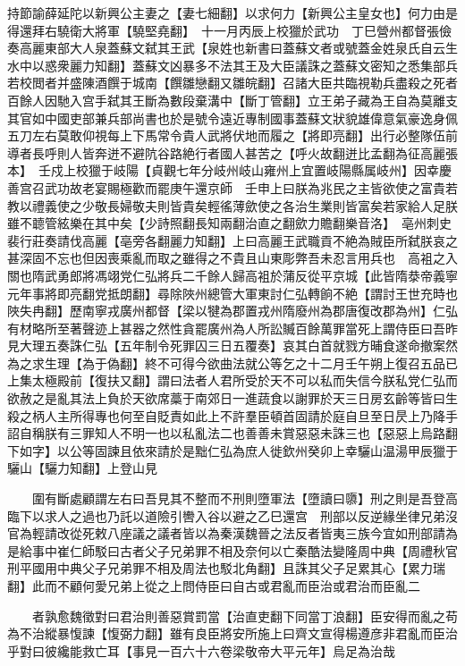 持節諭薛延陀以新興公主妻之【妻七細翻】以求何力【新興公主皇女也】何力由是得還拜右驍衛大將軍【驍堅堯翻】　十一月丙辰上校獵於武功　丁巳營州都督張儉奏高麗東部大人泉蓋蘇文弑其王武【泉姓也新書曰蓋蘇文者或號蓋金姓泉氏自云生水中以惑衆麗力知翻】蓋蘇文凶暴多不法其王及大臣議誅之蓋蘇文密知之悉集部兵若校閲者并盛陳酒饌于城南【饌雛戀翻又雛皖翻】召諸大臣共臨視勒兵盡殺之死者百餘人因馳入宫手弑其王斷為數段棄溝中【斷丁管翻】立王弟子藏為王自為莫離支其官如中國吏部兼兵部尚書也於是號令遠近專制國事蓋蘇文狀貌雄偉意氣豪逸身佩五刀左右莫敢仰視每上下馬常令貴人武將伏地而履之【將即亮翻】出行必整隊伍前導者長呼則人皆奔迸不避阬谷路絶行者國人甚苦之【呼火故翻迸比孟翻為征高麗張本】　壬戍上校獵于岐陽【貞觀七年分岐州岐山雍州上宜置岐陽縣属岐州】因幸慶善宫召武功故老宴賜極歡而罷庚午還京師　壬申上曰朕為兆民之主皆欲使之富貴若教以禮義使之少敬長婦敬夫則皆貴矣輕徭薄歛使之各治生業則皆富矣若家給人足朕雖不聼管絃樂在其中矣【少詩照翻長知兩翻治直之翻歛力贍翻樂音洛】　亳州刺史裴行莊奏請伐高麗【亳旁各翻麗力知翻】上曰高麗王武職貢不絶為賊臣所弑朕哀之甚深固不忘也但因喪乘亂而取之雖得之不貴且山東彫弊吾未忍言用兵也　高袓之入關也隋武勇郎將馮翊党仁弘將兵二千餘人歸高袓於蒲反從平京城【此皆隋㳟帝義寧元年事將即亮翻党抵朗翻】尋除陜州總管大軍東討仁弘轉餉不絶【謂討王世充時也陜失冉翻】歷南寧戎廣州都督【梁以犍為郡置戎州隋廢州為郡唐復改郡為州】仁弘有材略所至著聲迹上甚器之然性貪罷廣州為人所訟贓百餘萬罪當死上謂侍臣曰吾昨見大理五奏誅仁弘【五年制令死罪囚三日五覆奏】哀其白首就戮方晡食遂命撤案然為之求生理【為于偽翻】終不可得今欲曲法就公等乞之十二月壬午朔上復召五品已上集太極殿前【復扶又翻】謂曰法者人君所受於天不可以私而失信今朕私党仁弘而欲赦之是亂其法上負於天欲席藁于南郊日一進蔬食以謝罪於天三日房玄齡等皆曰生殺之柄人主所得專也何至自貶責如此上不許羣臣頓首固請於庭自旦至日昃上乃降手詔自稱朕有三罪知人不明一也以私亂法二也善善未賞惡惡未誅三也【惡惡上烏路翻下如字】以公等固諫且依來請於是黜仁弘為庶人徙欽州癸卯上幸驪山温湯甲辰獵于驪山【驪力知翻】上登山見

　　圍有斷處顧謂左右曰吾見其不整而不刑則墮軍法【墮讀曰隳】刑之則是吾登高臨下以求人之過也乃託以道險引轡入谷以避之乙巳還宫　刑部以反逆緣坐律兄弟沒官為輕請改從死敕八座議之議者皆以為秦漢魏晉之法反者皆夷三族今宜如刑部請為是給事中崔仁師駁曰古者父子兄弟罪不相及奈何以亡秦酷法變隆周中典【周禮秋官刑平國用中典父子兄弟罪不相及周法也駁北角翻】且誅其父子足累其心【累力瑞翻】此而不顧何愛兄弟上從之上問侍臣曰自古或君亂而臣治或君治而臣亂二

　　者孰愈魏徵對曰君治則善惡賞罰當【治直吏翻下同當丁浪翻】臣安得而亂之苟為不治縱暴愎諫【愎弼力翻】雖有良臣將安所施上曰齊文宣得楊遵彦非君亂而臣治乎對曰彼纔能救亡耳【事見一百六十六卷梁敬帝大平元年】烏足為治哉

